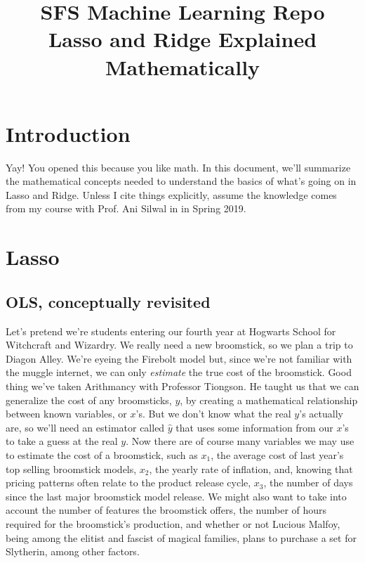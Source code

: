 \documentclass{article}                 %
\title{ SFS Machine Learning Repo \\ Lasso and Ridge Explained Mathematically }
\author{}
\date{}                    							%
\begin{document}
	\maketitle
	\tableofcontents       %

	\newpage

\section{Introduction}
	Yay! You opened this because you like math. In this document, we'll summarize the mathematical concepts needed to understand the basics of what's going on in Lasso and Ridge. Unless I cite things explicitly, assume the knowledge comes from my course with Prof. Ani Silwal in in Spring 2019.

\newpage
\section{Lasso}
\subsection{OLS, conceptually revisited}
	Let's pretend we're students entering our fourth year at Hogwarts School for Witchcraft and Wizardry. We really need a new broomstick, so we plan a trip to Diagon Alley. We're eyeing the Firebolt model but, since we're not familiar with the muggle internet, we can only \textit{estimate} the true cost of the broomstick. Good thing we've taken Arithmancy with Professor Tiongson. He taught us that we can generalize the cost of any broomsticks, $y$, by creating a mathematical relationship between known variables, or $x$'s. But we don't know what the real $y$'s actually are, so we'll need an estimator called $\hat{y}$ that uses some information from our $x$'s to take a guess at the real $y$. Now there are of course many variables we may use to estimate the cost of a broomstick, such as $x_1$, the average cost of last year's top selling broomstick models, $x_2$, the yearly rate of inflation, and, knowing that pricing patterns often relate to the product release cycle, $x_3$, the number of days since the last major broomstick model release. We might also want to take into account the number of features the broomstick offers, the number of hours required for the broomstick's production, and whether or not Lucious Malfoy, being among the elitist and fascist of magical families, plans to purchase a set for Slytherin, among other factors.
\end{document}
